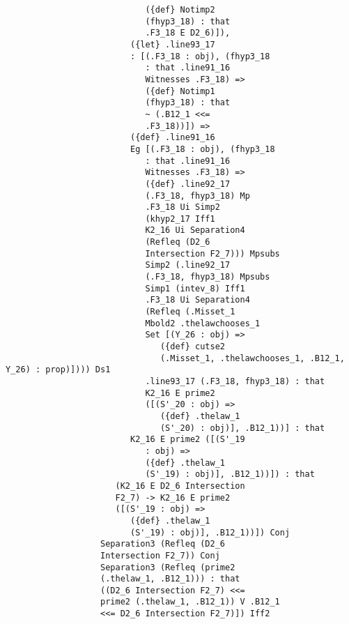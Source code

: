 \documentclass[12pt]{article}
\begin{document}
\begin{verbatim}
                            ({def} Notimp2 
                            (fhyp3_18) : that 
                            .F3_18 E D2_6)]), 
                         ({let} .line93_17 
                         : [(.F3_18 : obj), (fhyp3_18 
                            : that .line91_16 
                            Witnesses .F3_18) => 
                            ({def} Notimp1 
                            (fhyp3_18) : that 
                            ~ (.B12_1 <<= 
                            .F3_18))]) => 
                         ({def} .line91_16 
                         Eg [(.F3_18 : obj), (fhyp3_18 
                            : that .line91_16 
                            Witnesses .F3_18) => 
                            ({def} .line92_17 
                            (.F3_18, fhyp3_18) Mp 
                            .F3_18 Ui Simp2 
                            (khyp2_17 Iff1 
                            K2_16 Ui Separation4 
                            (Refleq (D2_6 
                            Intersection F2_7))) Mpsubs 
                            Simp2 (.line92_17 
                            (.F3_18, fhyp3_18) Mpsubs 
                            Simp1 (intev_8) Iff1 
                            .F3_18 Ui Separation4 
                            (Refleq (.Misset_1 
                            Mbold2 .thelawchooses_1 
                            Set [(Y_26 : obj) => 
                               ({def} cutse2 
                               (.Misset_1, .thelawchooses_1, .B12_1, Y_26) : prop)]))) Ds1 
                            .line93_17 (.F3_18, fhyp3_18) : that 
                            K2_16 E prime2 
                            ([(S'_20 : obj) => 
                               ({def} .thelaw_1 
                               (S'_20) : obj)], .B12_1))] : that 
                         K2_16 E prime2 ([(S'_19 
                            : obj) => 
                            ({def} .thelaw_1 
                            (S'_19) : obj)], .B12_1))]) : that 
                      (K2_16 E D2_6 Intersection 
                      F2_7) -> K2_16 E prime2 
                      ([(S'_19 : obj) => 
                         ({def} .thelaw_1 
                         (S'_19) : obj)], .B12_1))]) Conj 
                   Separation3 (Refleq (D2_6 
                   Intersection F2_7)) Conj 
                   Separation3 (Refleq (prime2 
                   (.thelaw_1, .B12_1))) : that 
                   ((D2_6 Intersection F2_7) <<= 
                   prime2 (.thelaw_1, .B12_1)) V .B12_1 
                   <<= D2_6 Intersection F2_7)]) Iff2 

\end{verbatim}
\end{document}
